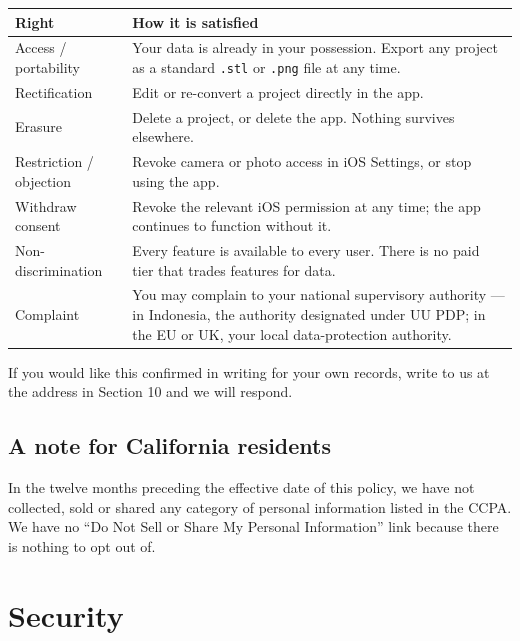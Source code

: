 \documentclass[11pt]{article}
\begin{document}
\begin{plainbox}
\uifont\small
\begin{tabular}{@{}p{}p{}@{}}
\toprule
\textbf{Right} & \textbf{How it is satisfied} \\
\midrule
Access / portability  & Your data is already in your possession. Export any project as
                        a standard \texttt{.stl} or \texttt{.png} file at any time. \\
Rectification         & Edit or re-convert a project directly in the app. \\
Erasure               & Delete a project, or delete the app. Nothing survives
                        elsewhere. \\
Restriction / objection & Revoke camera or photo access in iOS Settings, or stop using
                        the app. \\
Withdraw consent      & Revoke the relevant iOS permission at any time; the app
                        continues to function without it. \\
Non-discrimination    & Every feature is available to every user. There is no paid
                        tier that trades features for data. \\
Complaint             & You may complain to your national supervisory authority — in
                        Indonesia, the authority designated under UU PDP; in the EU or
                        UK, your local data-protection authority. \\
\bottomrule
\end{tabular}
\end{plainbox}

If you would like this confirmed in writing for your own records, write to us at the
address in Section 10 and we will respond.

\subsection{A note for California residents}
In the twelve months preceding the effective date of this policy, we have not
collected, sold or shared any category of personal information listed in the CCPA. We
have no “Do Not Sell or Share My Personal Information” link because there is nothing
to opt out of.

\section{Security}
\end{document}
